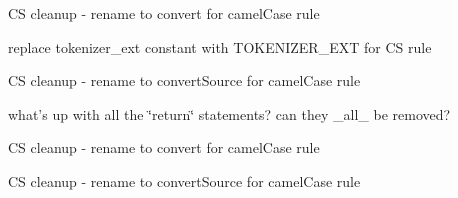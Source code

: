 \begin{DoxyRefList}
\item[\label{todo__todo000138}%
\hypertarget{todo__todo000138}{}%
\-Global \hyperlink{classparser_entity_a77af191d91c08203fe89824e3909a3f8}{parser\-Entity} (\&\$c, \$postprocess=true)]\-C\-S cleanup -\/ rename to convert for camel\-Case rule  
\item[\label{todo__todo000116}%
\hypertarget{todo__todo000116}{}%
\-Global \hyperlink{classparser_example_inline_tag_a8d152e374dbf66e8adb6cb2b8a7cd11f}{parser\-Example\-Inline\-Tag} (\$value, \$current\-\_\-path, \$is\-Tutorial=false)]replace tokenizer\-\_\-ext constant with \-T\-O\-K\-E\-N\-I\-Z\-E\-R\-\_\-\-E\-X\-T for \-C\-S rule  
\item[\label{todo__todo000074}%
\hypertarget{todo__todo000074}{}%
\-Global \hyperlink{classparser_example_tag_ac04d3e20b49fa4ddfce71354ef2044f9}{parser\-Example\-Tag} (\&\$c)]\-C\-S cleanup -\/ rename to convert\-Source for camel\-Case rule 

what's up with all the \char`\"{}return\char`\"{} statements? can they \-\_\-all\-\_\- be removed?  
\item[\label{todo__todo000071}%
\hypertarget{todo__todo000071}{}%
\-Global \hyperlink{classparser_file_source_tag_ad6c06bea9d11cc1c362b592306cfa707}{parser\-File\-Source\-Tag} (\&\$c)]\-C\-S cleanup -\/ rename to convert for camel\-Case rule  
\item[\label{todo__todo000072}%
\hypertarget{todo__todo000072}{}%
\-Global \hyperlink{classparser_file_source_tag_ac04d3e20b49fa4ddfce71354ef2044f9}{parser\-File\-Source\-Tag} (\&\$c)]\-C\-S cleanup -\/ rename to convert\-Source for camel\-Case rule 


\end{DoxyRefList}
